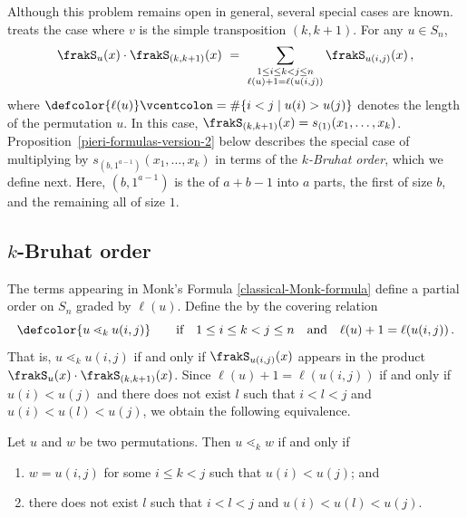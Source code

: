 Although this problem remains open in general, several special cases are known.
~\cite{Monk} treats the case where $v$ is the simple transposition $(k, k{+}1)$.
For any $u \in S_n$,
  \begin{equation}
    \label{classical-Monk-formula}
    \frakS_u(x) \cdot \frakS_{(k,k+1)}(x)
       \ =\ 
    \sum_{\substack{1 \leq i \leq k < j \leq n \\ \ell(u) + 1 = \ell(u(i,j))}} \frakS_{u (i,j)}(x)\,,
 \end{equation}
where $\defcolor{\ell(u)}\vcentcolon=\#\{i<j\mid u(i)>u(j)\}$ denotes the length of the permutation $u$.
In this case, $\frakS_{(k, k+1)}(x) = s_{(1)}(x_1, \ldots, x_k)$.
Proposition~\ref{pieri-formulas-version-2} below describes the special case of
multiplying by $s_{(b, 1^{a-1})}(x_1, \ldots, x_k)$
in terms of the \emph{$k$-Bruhat order}, which we define next.
Here, $(b,1^{a-1})$ is the  of $a{+}b{-}1$ into $a$ parts, the first of size $b$, and the remaining all of size $1$.

\subsection{\texorpdfstring{$k$}{k}-Bruhat order}

The terms appearing in Monk's Formula \eqref{classical-Monk-formula}
define a partial order on $S_n$ graded by $\ell(u)$.
Define the  by the covering relation
\[
    {\defcolor{u\lessdot_k u (i,j)}}
    \qquad\text{if}\quad
    1 \leq i\leq k<j \leq n
    \quad\text{and}\quad
    \ell(u)+1=\ell(u(i,j))\,.
\]
That is, $u\lessdot_k u (i,j)$ if and only if $\frakS_{u(i,j)}(x)$ appears in the product
$\frakS_{u}(x) \cdot \frakS_{(k,k+1)}(x)$.
Since $\ell(u)+1=\ell(u (i,j))$ if and only if $u(i)<u(j)$ and there does not
exist $l$ such that $i < l < j$ and $u(i) < u(l) < u(j)$, we obtain the
following equivalence.

\begin{proposition}
    \label{nothing-in-between-is-in-between}
    Let $u$ and $w$ be two permutations.
    Then $u \lessdot_k w$ if and only if
    \begin{enumerate} 
        \item
            $w = u(i, j)$ for some $i \leq k < j$ such that $u(i) < u(j)$;
            and

        \item
            there does not exist $l$ such that
            $i < l < j$ and $u(i) < u(l) < u(j)$.
    \end{enumerate}
\end{proposition}

